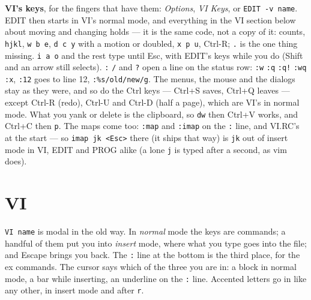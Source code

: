 \textbf{VI's keys}, for the fingers that have them: \emph{Options},
\emph{VI Keys}, or \verb|EDIT -v name|. EDIT then starts in VI's normal
mode, and everything in the VI section below about moving and changing
holds --- it is the same code, not a copy of it: counts, \verb|hjkl|,
\verb|w b e|, \verb|d c y| with a motion or doubled, \verb|x p u|,
Ctrl-R; \verb|.| is the one thing missing. \verb|i a o| and the rest
type until Esc, with EDIT's keys while you do (Shift and an arrow still
selects). \verb|:| \verb|/| and \verb|?| open a line on the status row:
\verb|:w| \verb|:q| \verb|:q!| \verb|:wq| \verb|:x|, \verb|:12| goes
to line 12, \verb|:%s/old/new/g|. The menus, the mouse and the dialogs
stay as they were, and so do the Ctrl keys --- Ctrl+S saves, Ctrl+Q
leaves --- except Ctrl-R (redo), Ctrl-U and Ctrl-D (half a page), which
are VI's in normal mode. What you yank or delete is the clipboard, so
\verb|dw| then Ctrl+V works, and Ctrl+C then \verb|p|. The maps come too:
\verb|:map| and \verb|:imap| on the \verb|:| line, and VI.RC's at the start
--- so \verb|imap jk <Esc>| there (it ships that way) is \verb|jk| out of
insert mode in VI, EDIT and PROG alike (a lone \verb|j| is typed after a
second, as vim does).

\section{VI}
\verb|VI name| is modal in the old way. In \emph{normal} mode the keys
are commands; a handful of them put you into \emph{insert} mode, where
what you type goes into the file; and Escape brings you back. The
\verb|:| line at the bottom is the third place, for the ex commands. The
cursor says which of the three you are in: a block in normal mode, a bar
while inserting, an underline on the \verb|:| line. Accented letters go
in like any other, in insert mode and after \verb|r|.

